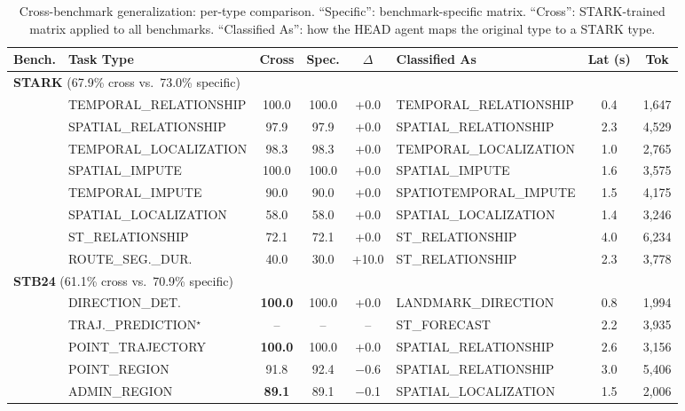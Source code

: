 \begin{table}[!htbp]
\centering
\caption{Cross-benchmark generalization: per-type comparison.  ``Specific'': benchmark-specific matrix.  ``Cross'': STARK-trained matrix applied to all benchmarks.  ``Classified As'': how the HEAD agent maps the original type to a STARK type.}
\label{tab:cross_full}
\scriptsize
\setlength{\tabcolsep}{2pt}
\begin{tabular}{l l cc c l cc}
\toprule
Bench. & Task Type & Cross & Spec. & $\Delta$ & Classified As & Lat (s) & Tok \\
\midrule
\multicolumn{8}{l}{\textbf{STARK} (67.9\% cross vs.\ 73.0\% specific)} \\
& TEMPORAL\_RELATIONSHIP       & 100.0 & 100.0 & +0.0 & TEMPORAL\_RELATIONSHIP       & 0.4 & 1{,}647 \\
& SPATIAL\_RELATIONSHIP        & 97.9  & 97.9  & +0.0 & SPATIAL\_RELATIONSHIP        & 2.3 & 4{,}529 \\
& TEMPORAL\_LOCALIZATION       & 98.3  & 98.3  & +0.0 & TEMPORAL\_LOCALIZATION       & 1.0 & 2{,}765 \\
& SPATIAL\_IMPUTE              & 100.0 & 100.0 & +0.0 & SPATIAL\_IMPUTE              & 1.6 & 3{,}575 \\
& TEMPORAL\_IMPUTE             & 90.0  & 90.0  & +0.0 & SPATIOTEMPORAL\_IMPUTE       & 1.5 & 4{,}175 \\
& SPATIAL\_LOCALIZATION        & 58.0  & 58.0  & +0.0 & SPATIAL\_LOCALIZATION        & 1.4 & 3{,}246 \\
& ST\_RELATIONSHIP             & 72.1  & 72.1  & +0.0 & ST\_RELATIONSHIP             & 4.0 & 6{,}234 \\
& ROUTE\_SEG.\_DUR.            & 40.0  & 30.0  & +10.0 & ST\_RELATIONSHIP            & 2.3 & 3{,}778 \\
\midrule
\multicolumn{8}{l}{\textbf{STB24} (61.1\% cross vs.\ 70.9\% specific)} \\
& DIRECTION\_DET.              & \textbf{100.0} & 100.0 & +0.0  & LANDMARK\_DIRECTION          & 0.8 & 1{,}994 \\
& TRAJ.\_PREDICTION$^\star$    & --             & --    & --    & ST\_FORECAST                 & 2.2 & 3{,}935 \\
& POINT\_TRAJECTORY            & \textbf{100.0} & 100.0 & +0.0  & SPATIAL\_RELATIONSHIP        & 2.6 & 3{,}156 \\
& POINT\_REGION                & 91.8  & 92.4  & $-$0.6 & SPATIAL\_RELATIONSHIP        & 3.0 & 5{,}406 \\
& ADMIN\_REGION                & \textbf{89.1}  & 89.1  & $-$0.1 & SPATIAL\_LOCALIZATION        & 1.5 & 2{,}006 \\

\end{tabular}
\end{table}
